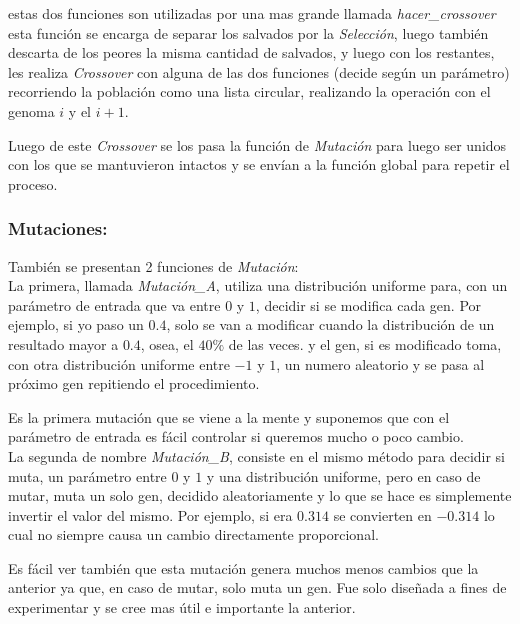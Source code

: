 estas dos funciones son utilizadas por una mas grande llamada \emph{hacer\_crossover} esta función se encarga de separar los salvados
por la \emph{Selección}, luego también descarta de los peores la misma cantidad de salvados, y luego con los restantes, les realiza
\emph{Crossover} con alguna de las dos funciones (decide según un parámetro) recorriendo la población como una lista circular,
realizando la operación con el genoma $i$ y el $i+1$.

Luego de este \emph{Crossover} se los pasa la función de \emph{Mutación} para luego ser unidos con los que se mantuvieron
intactos y se envían a la función global para repetir el proceso.


\subsubsection{Mutaciones:}

También se presentan 2 funciones de \emph{Mutación}:\\

La primera, llamada \emph{Mutación\_A}, utiliza una distribución uniforme para, con un parámetro de entrada que va entre $0$ y $1$,
decidir si se modifica cada gen. Por ejemplo, si yo paso un $0.4$, solo se van a modificar cuando
la distribución de un resultado mayor a $0.4$, osea, el $40\%$ de las veces. y el gen, si es modificado toma,
con otra distribución uniforme entre $-1$ y $1$, un numero aleatorio y se pasa al próximo gen repitiendo
el procedimiento.


Es la primera mutación que se viene a la mente y suponemos que con el parámetro de entrada es fácil controlar si queremos
mucho o poco cambio.\\

La segunda de nombre \emph{Mutación\_B}, consiste en el mismo método para decidir si muta, un parámetro  entre $0$ y $1$
y una distribución uniforme, pero en caso de mutar, muta un solo gen, decidido aleatoriamente y lo que se hace es simplemente
invertir el valor del mismo. Por ejemplo, si era $0.314$ se convierten en $-0.314$ lo cual no siempre causa un cambio
directamente proporcional.

Es fácil ver también que esta mutación genera muchos menos cambios que la anterior ya que, en caso de mutar, solo muta un gen.
Fue solo diseñada a fines de experimentar y se cree mas útil e importante la anterior.

